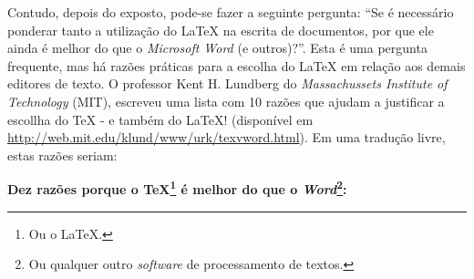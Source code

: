 Contudo, depois do exposto, pode-se fazer a seguinte pergunta: ``Se é necessário ponderar tanto a utilização do \LaTeX{} na escrita de documentos, por que ele ainda é melhor do que o \textit{Microsoft Word} (e outros)?''. Esta é uma pergunta frequente, mas há razões práticas para a escolha do \LaTeX{} em relação aos demais editores de texto. O professor Kent H. Lundberg do \textit{Massachussets Institute of Technology} (MIT), escreveu uma lista com 10 razões que ajudam a justificar a escollha do \TeX{} - e também do \LaTeX{}! (disponível em \url{http://web.mit.edu/klund/www/urk/texvword.html}). Em uma tradução livre, estas razões seriam:

\textbf{Dez razões porque o \TeX{}\footnote{Ou o \LaTeX{}.} é melhor do que o \textit{Word}\footnote{Ou qualquer outro \textit{software} de processamento de textos.}:}

